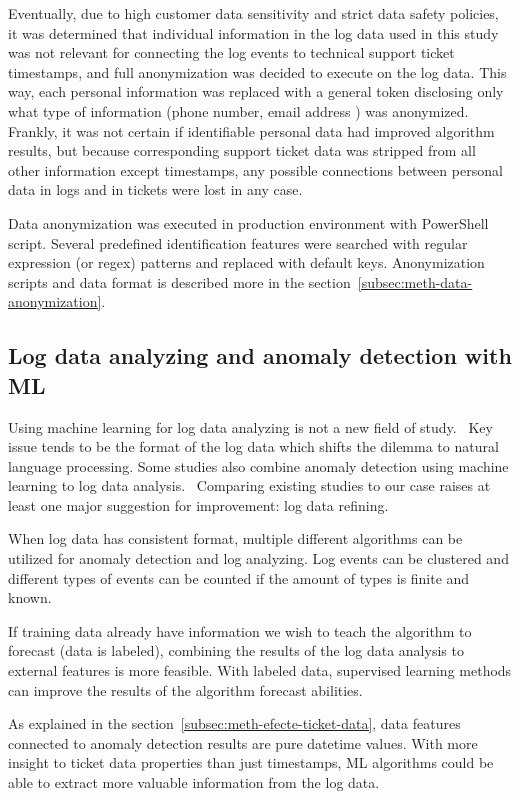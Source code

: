 Eventually,
due to high customer data sensitivity and strict data safety policies,
it was determined that individual information in the log data used in this study
was not relevant for connecting the log events to technical support ticket timestamps,
and full anonymization was decided to execute on the log data.
This way,
each personal information was replaced with a general token
disclosing only what type of information (phone number, email address \etc) was anonymized.
Frankly,
it was not certain if identifiable personal data had improved algorithm results,
but because corresponding support ticket data
was stripped from all other information except timestamps,
any possible connections between personal data in logs and in tickets
were lost in any case.

Data anonymization was executed in production environment
with PowerShell script.
Several predefined identification features were searched with
regular expression (or regex) patterns and replaced with
default keys.
Anonymization scripts and data format
is described more in the section~\ref{subsec:meth-data-anonymization}.



\subsection{Log data analyzing and anomaly detection with ML}\label{subsec:bg-log-data-analyzing-and-anomaly-detection-with-ml}

Using machine learning for log data analyzing
is not a new field of study.~\cite{rantala2019applying,allagi2019analysis,kondo2017early,cao2017machine}
Key issue tends to be the format of the log data
which shifts the dilemma to natural language processing.
Some studies also combine anomaly detection using machine learning
to log data analysis.~\cite{liu2019loganomaly, zhang2019robust}
Comparing existing studies to our case
raises at least one major suggestion for improvement:
log data refining.

When log data has consistent format,
multiple different algorithms can be utilized
for anomaly detection and log analyzing.
Log events can be clustered
and different types of events can be counted
if the amount of types is finite and known.~\cite{liu2019loganomaly}

If training data already have information
we wish to teach the algorithm to forecast (\ie data is labeled),
combining the results of the log data analysis to external features
is more feasible.
With labeled data,
supervised learning methods can improve the results of the algorithm forecast abilities.
~\cite{rantala2019applying}

As explained in the section~\ref{subsec:meth-efecte-ticket-data},
data features connected to anomaly detection results
are pure datetime values.
With more insight to ticket data properties than just timestamps,
ML algorithms could be able to extract more valuable information
from the log data.


\clearpage